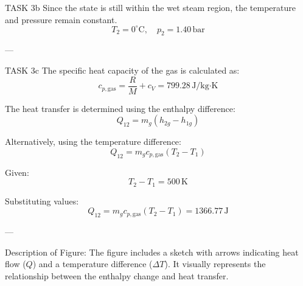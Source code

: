 TASK 3b  
Since the state is still within the wet steam region, the temperature and pressure remain constant.  
\[
T_2 = 0^\circ\text{C}, \quad p_2 = 1.40 \, \text{bar}
\]

---

TASK 3c  
The specific heat capacity of the gas is calculated as:  
\[
c_{p,\text{gas}} = \frac{R}{M} + c_V = 799.28 \, \text{J/kg·K}
\]

The heat transfer is determined using the enthalpy difference:  
\[
Q_{12} = m_g (h_{2g} - h_{1g})
\]

Alternatively, using the temperature difference:  
\[
Q_{12} = m_g c_{p,\text{gas}} (T_2 - T_1)
\]

Given:  
\[
T_2 - T_1 = 500 \, \text{K}
\]

Substituting values:  
\[
Q_{12} = m_g c_{p,\text{gas}} (T_2 - T_1) = 1366.77 \, \text{J}
\]

---

Description of Figure:  
The figure includes a sketch with arrows indicating heat flow (\( Q \)) and a temperature difference (\( \Delta T \)). It visually represents the relationship between the enthalpy change and heat transfer.